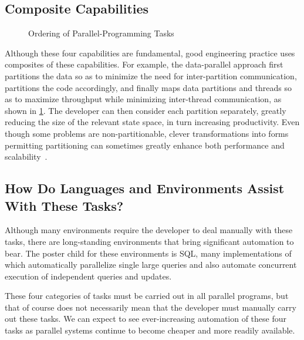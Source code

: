 \subsection{Composite Capabilities}
\label{sec:Composite Capabilities}

\begin{figure}
\centering
{}
\caption{Ordering of Parallel-Programming Tasks}
\label{fig:intro:Ordering of Parallel-Programming Tasks}
\end{figure}

Although these four capabilities are fundamental,
good engineering practice uses composites of
these capabilities.
For example, the data-parallel approach first
partitions the data so as to minimize the need for
inter-partition communication, partitions the code accordingly,
and finally maps data partitions and threads so as to maximize
throughput while minimizing inter-thread communication,
as shown in
\cref{fig:intro:Ordering of Parallel-Programming Tasks}.
The developer can then
consider each partition separately, greatly reducing the size
of the relevant state space, in turn increasing productivity.
Even though some problems are non-partitionable,
clever transformations into forms permitting partitioning can
sometimes greatly enhance
both performance and scalability~\cite{PanagiotisMetaxas1999PDCS}.

\subsection{How Do Languages and Environments Assist With These Tasks?}
\label{sec:intro:How Do Languages and Environments Assist With These Tasks?}

Although many environments require the developer to deal manually
with these tasks, there are long-standing environments that bring
significant automation to bear.
The poster child for these environments is SQL, many implementations
of which automatically parallelize single large queries and also
automate concurrent execution of independent queries and updates.

These four categories of tasks must be carried out in all parallel
programs, but that of course does not necessarily mean that the developer
must manually carry out these tasks.
We can expect to see ever-increasing automation of these four tasks
as parallel systems continue to become cheaper and more readily available.

